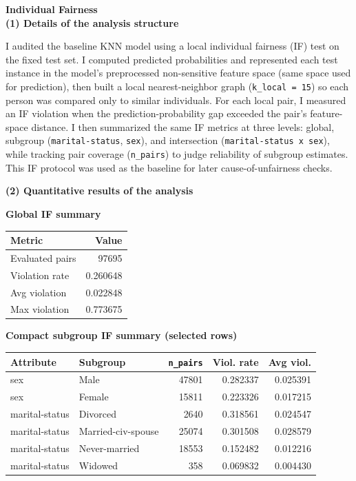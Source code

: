 \documentclass[11pt,a4paper]{article}
\begin{document}
{\Large \textbf{Individual Fairness}}\\[-0.2em]

\textbf{(1) Details of the analysis structure}

I audited the baseline KNN model using a local individual fairness (IF) test on the fixed test set. I computed predicted probabilities and represented each test instance in the model's preprocessed non-sensitive feature space (same space used for prediction), then built a local nearest-neighbor graph (\texttt{k\_local = 15}) so each person was compared only to similar individuals. For each local pair, I measured an IF violation when the prediction-probability gap exceeded the pair's feature-space distance. I then summarized the same IF metrics at three levels: global, subgroup (\texttt{marital-status}, \texttt{sex}), and intersection (\texttt{marital-status x sex}), while tracking pair coverage (\texttt{n\_pairs}) to judge reliability of subgroup estimates. This IF protocol was used as the baseline for later cause-of-unfairness checks.

\textbf{(2) Quantitative results of the analysis}

\textbf{Global IF summary}

\begin{center}
\begin{tabular}{@{}lr@{}}
\toprule
Metric & Value \\
\midrule
Evaluated pairs & 97695 \\
Violation rate & 0.260648 \\
Avg violation & 0.022848 \\
Max violation & 0.773675 \\
\bottomrule
\end{tabular}
\end{center}

\textbf{Compact subgroup IF summary (selected rows)}

\begin{center}
\begin{tabularx}{\linewidth}{@{}lYrrr@{}}
\toprule
Attribute & Subgroup & \texttt{n\_pairs} & Viol. rate & Avg viol. \\
\midrule
sex & Male & 47801 & 0.282337 & 0.025391 \\
sex & Female & 15811 & 0.223326 & 0.017215 \\
marital-status & Divorced & 2640 & 0.318561 & 0.024547 \\
marital-status & Married-civ-spouse & 25074 & 0.301508 & 0.028579 \\
marital-status & Never-married & 18553 & 0.152482 & 0.012216 \\
marital-status & Widowed & 358 & 0.069832 & 0.004430 \\
\bottomrule
\end{tabularx}
\end{center}
\end{document}
